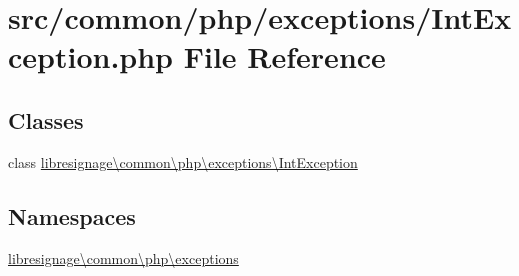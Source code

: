\hypertarget{IntException_8php}{}\section{src/common/php/exceptions/\+Int\+Exception.php File Reference}
\label{IntException_8php}
\subsection*{Classes}
\begin{DoxyCompactItemize}
\item 
class \hyperlink{classlibresignage_1_1common_1_1php_1_1exceptions_1_1IntException}{libresignage\textbackslash{}common\textbackslash{}php\textbackslash{}exceptions\textbackslash{}\+Int\+Exception}
\end{DoxyCompactItemize}
\subsection*{Namespaces}
\begin{DoxyCompactItemize}
\item 
 \hyperlink{namespacelibresignage_1_1common_1_1php_1_1exceptions}{libresignage\textbackslash{}common\textbackslash{}php\textbackslash{}exceptions}
\end{DoxyCompactItemize}
